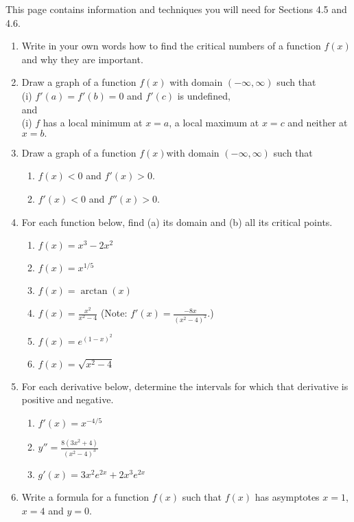 \documentclass[12pt]{article}
\begin{document}
This page contains information and techniques you will need for Sections 4.5 and 4.6.
\begin{enumerate}
\item Write in your own words how to find the critical numbers of a function $f(x)$ and why they are important.
\vspace{1in}
\item Draw a graph of a function $f(x)$ with domain $(-\infty, \infty)$  such that \\
(i) $f'(a)=f'(b)=0$ and $f'(c)$ is undefined,\\
and\\
(i) $f$ has a local minimum at $x=a$, a local maximum at $x=c$ and neither at $x=b.$
\vfill
\item Draw a graph of a function $f(x)$with domain $(-\infty, \infty)$ such that \\
\begin{multicols}{2}
\begin{enumerate}
\item $f(x)<0$ and $f'(x) >0.$
\item $f'(x)<0$ and $f''(x) >0.$
\end{enumerate}
\end{multicols}
\vfill
\newpage
\item For each function below, find (a) its domain and (b) all its critical points.
	\begin{enumerate}
	\item $f(x)=x^3-2x^2$
	\vfill
	\item $f(x)=x^{1/5}$
	\vfill
	\item $f(x)=\arctan(x)$
	\vfill
	\item $f(x)=\frac{x^2}{x^2-4}$ (Note: $f'(x)=\frac{-8x}{(x^2-4)^2}.$)
	\vfill
	\item $f(x)=e^{(1-x)^2}$
	\vfill
	\item $f(x)=\sqrt{x^2-4}$
	\vfill
	\end{enumerate}
\newpage
\item For each derivative below, determine the intervals for which that derivative is positive and negative.
\begin{enumerate}
\item $f'(x)=x^{-4/5}$
\vfill
\item $y''=\frac{8(3x^2+4)}{(x^2-4)^3}$
\vfill
\item $g'(x)=3x^2e^{2x}+2x^3e^{2x}$
\vfill
\end{enumerate}
\newpage
\item Write a formula for a function $f(x)$ such that $f(x)$ has asymptotes $x=1$, $x=4$ and $y=0.$
\vspace{1in}


\end{enumerate}
\end{document}
